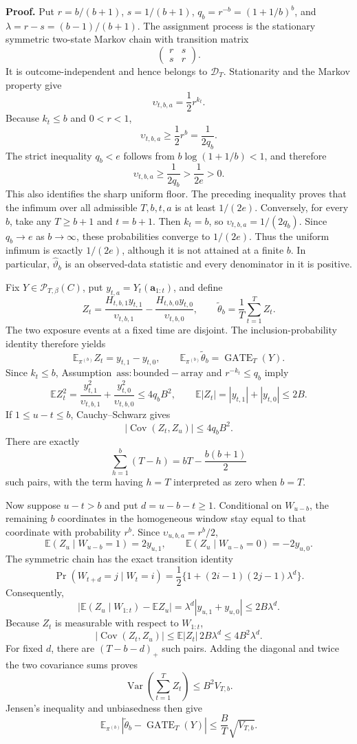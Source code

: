 \textbf{Proof.} Put \(r=b/(b+1)\), \(s=1/(b+1)\), \(q_b=r^{-b}=(1+1/b)^b\), and \(\lambda=r-s=(b-1)/(b+1)\). The assignment process is the stationary symmetric two-state Markov chain with transition matrix
\[
\begin{pmatrix}r&s\\s&r\end{pmatrix}.
\]
It is outcome-independent and hence belongs to \(\mathcal D_T\). Stationarity and the Markov property give
\[
\upsilon_{t,b,a}=\frac12r^{k_t}.
\]
Because \(k_t\le b\) and \(0<r<1\),
\[
\upsilon_{t,b,a}\ge\frac12r^b=\frac{1}{2q_b}.
\]
The strict inequality \(q_b<e\) follows from \(b\log(1+1/b)<1\), and therefore
\[
\upsilon_{t,b,a}\ge\frac{1}{2q_b}>\frac{1}{2e}>0.
\]
This also identifies the sharp uniform floor. The preceding inequality proves that the infimum over all admissible \(T,b,t,a\) is at least \(1/(2e)\). Conversely, for every \(b\), take any \(T\ge b+1\) and \(t=b+1\). Then \(k_t=b\), so \(\upsilon_{t,b,a}=1/(2q_b)\). Since \(q_b\to e\) as \(b\to\infty\), these probabilities converge to \(1/(2e)\). Thus the uniform infimum is exactly \(1/(2e)\), although it is not attained at a finite \(b\). In particular, \(\widehat\vartheta_b\) is an observed-data statistic and every denominator in it is positive.

Fix \(Y\in\mathcal P_{T,\beta}(C)\), put \(y_{t,a}=Y_t(\mathbf a_{1:t})\), and define
\[
Z_t=\frac{H_{t,b,1}y_{t,1}}{\upsilon_{t,b,1}}-\frac{H_{t,b,0}y_{t,0}}{\upsilon_{t,b,0}},
\qquad
\widetilde\theta_b=\frac1T\sum_{t=1}^T Z_t.
\]
The two exposure events at a fixed time are disjoint. The inclusion-probability identity therefore yields
\[
\mathbb E_{\pi^{(b)}}Z_t=y_{t,1}-y_{t,0},
\qquad
\mathbb E_{\pi^{(b)}}\widetilde\theta_b=\operatorname{GATE}_T(Y).
\]
Since \(k_t\le b\), Assumption~\(\mathrm{ass:bounded-array}\) and \(r^{-k_t}\le q_b\) imply
\[
\mathbb E Z_t^2
=\frac{y_{t,1}^2}{\upsilon_{t,b,1}}+\frac{y_{t,0}^2}{\upsilon_{t,b,0}}
\le4q_bB^2,
\qquad
\mathbb E|Z_t|=|y_{t,1}|+|y_{t,0}|\le2B.
\]
If \(1\le u-t\le b\), Cauchy--Schwarz gives
\[
|\operatorname{Cov}(Z_t,Z_u)|\le4q_bB^2.
\]
There are exactly
\[
\sum_{h=1}^b(T-h)=bT-\frac{b(b+1)}2
\]
such pairs, with the term having \(h=T\) interpreted as zero when \(b=T\).

Now suppose \(u-t>b\) and put \(d=u-b-t\ge1\). Conditional on \(W_{u-b}\), the remaining \(b\) coordinates in the homogeneous window stay equal to that coordinate with probability \(r^b\). Since \(\upsilon_{u,b,a}=r^b/2\),
\[
\mathbb E(Z_u\mid W_{u-b}=1)=2y_{u,1},
\qquad
\mathbb E(Z_u\mid W_{u-b}=0)=-2y_{u,0}.
\]
The symmetric chain has the exact transition identity
\[
\Pr(W_{t+d}=j\mid W_t=i)
=\frac12\{1+(2i-1)(2j-1)\lambda^d\}.
\]
Consequently,
\[
\left|\mathbb E(Z_u\mid W_{1:t})-\mathbb EZ_u\right|
=\lambda^d|y_{u,1}+y_{u,0}|
\le2B\lambda^d.
\]
Because \(Z_t\) is measurable with respect to \(W_{1:t}\),
\[
|\operatorname{Cov}(Z_t,Z_u)|
\le \mathbb E|Z_t|\,2B\lambda^d
\le4B^2\lambda^d.
\]
For fixed \(d\), there are \((T-b-d)_+\) such pairs. Adding the diagonal and twice the two covariance sums proves
\[
\operatorname{Var}\left(\sum_{t=1}^T Z_t\right)\le B^2V_{T,b}.
\]
Jensen's inequality and unbiasedness then give
\[
\mathbb E_{\pi^{(b)}}\left|\widetilde\theta_b-\operatorname{GATE}_T(Y)\right|
\le\frac BT\sqrt{V_{T,b}}.
\]

